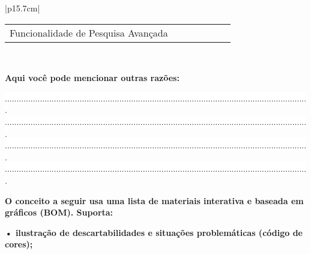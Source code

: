 \begin{longtable}{|p{15.7cm}|}
\begin{tabularx}{15.7 cm}{|X|X|X|X|X|X|X|}
		& {\rotatebox[origin=c]{90}{\parbox[c]{2.5cm}{\centering \textcolor{white}{.}\newline \medskip Discordo  Parcialmente }}} 
		& {\rotatebox[origin=c]{90}{\parbox[c]{2.5cm}{\centering \textcolor{white}{.}\newline \medskip Discordo  Completamente  }}}
		& {\rotatebox[origin=c]{90}{\parbox[c]{2.5cm}{\centering \textcolor{white}{.}\newline  \textcolor{white}{.}\newline Eu Não Sei }}} \\
		\hline
		Funcionalidade de Pesquisa Avançada &   &   &   &   &   &  \\
		\hline
	\end{tabularx}\\
	\begin{Spacing}{1.0} \end{Spacing}
	\begin{Spacing}{0.8} 
	\textbf{Aqui você pode mencionar outras razões:} \end{Spacing} 
	\begin{Spacing}{2.5} \end{Spacing} 
	\colorbox{white}{ .................................................................................................................................. } \\
	\colorbox{white}{ .................................................................................................................................. } \\
	\colorbox{white}{ .................................................................................................................................. } \\
	\colorbox{white}{ .................................................................................................................................. } \\
	\begin{Spacing}{0.4} \end{Spacing}
	\begin{Spacing}{1.4} 
		\textbf{ O conceito a seguir usa uma lista de materiais interativa e baseada em gráficos (BOM). Suporta:}  \end{Spacing} 	
	\begin{Spacing}{1.4} 
		\textbf{• ilustração de descartabilidades e situações problemáticas (código de cores);} \end{Spacing} 	
	\begin{Spacing}{1.4} 

\end{Spacing}
\end{longtable}
